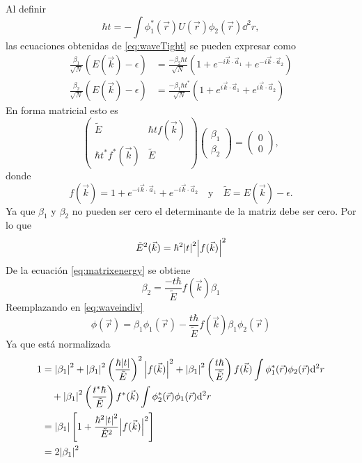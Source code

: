 Al definir 
\begin{equation}
 \hbar t = -\int \phi_1^{\ast}(\vec{r}) U(\vec{r}) \phi_2(\vec{r}) \dd^2 r,
\end{equation}
las ecuaciones obtenidas de \eqref{eq:waveTight} se pueden expresar como
\begin{align}
  \frac{\beta_1}{\sqrt{N}}(E(\vec{k})-\epsilon) & =\frac{-\beta_2 \hbar t}{\sqrt{N}}\left(1+e^{-i \vec{k}\cdot \vec{a}_1}+e^{-i \vec{k}\cdot \vec{a}_2}\right) \\
  \frac{\beta_2}{\sqrt{N}}(E(\vec{k})-\epsilon)   & =\frac{-\beta_1\hbar t^{\ast}}{\sqrt{N}}\left(1+e^{i \vec{k}\cdot \vec{a}_1}+e^{i \vec{k}\cdot \vec{a}_2}\right)
\end{align}
En forma matricial esto es
\begin{equation}
	\begin{pmatrix}
    \tilde{E}                                     & \hbar tf(\vec{k}) \\
    \hbar t^{\ast}f^{\ast}(\vec{k}) & \tilde{E}
	\end{pmatrix}\begin{pmatrix}
		\beta_1 \\\beta_2
	\end{pmatrix}= \begin{pmatrix}
		0 \\0
	\end{pmatrix},\label{eq:matrixenergy}
\end{equation}
donde
\begin{equation}
  f(\vec{k}) =1+e^{-i \vec{k}\cdot \vec{a}_1}+e^{-i \vec{k}\cdot \vec{a}_2}\quad\text{y}\quad \tilde{E} = E(\vec{k}) - \epsilon.
\end{equation}
Ya que $\beta_1$ y $\beta_2$ no pueden ser cero el determinante de la matriz debe ser cero. Por lo que
\begin{equation}
  \tilde{E}^2(\vec{k}) = \hbar^2\abs{t}^2\abs{f(\vec{k})}^2\label{eq:energysquare}
\end{equation}
De la ecuación \eqref{eq:matrixenergy} se obtiene
\begin{equation}
  \beta_2 = \frac{-t\hbar}{\tilde{E}}f(\vec{k})\beta_1
\end{equation}
Reemplazando en \eqref{eq:waveindiv}
\begin{equation}
  \phi(\vec{r}) = \beta_1 \phi_1(\vec{r}) - \frac{t\hbar}{\tilde{E}}f(\vec{k})\beta_1 \phi_2(\vec{r})
\end{equation}
Ya que está normalizada
\begin{equation}
  \begin{aligned}[b]
    1 & = \abs{\beta_1}^2 +\abs{\beta_1}^2\left(\frac{\hbar\abs{t}}{\tilde{E}}\right)^2\abs{f(\vec{k})}^2+\abs{\beta_1}^2\left(\frac{t\hbar}{\tilde{E}}\right)f(\vec{k})\int \phi_1^{\ast}(\vec{r})\phi_2(\vec{r}) \dd^2 r \\&\quad+\abs{\beta_1}^2\left(\frac{t^{\ast}\hbar}{\tilde{E}}\right)f^{\ast}(\vec{k})\int \phi_2^{\ast}(\vec{r})\phi_1(\vec{r}) \dd^2 r\\
      & = \abs{\beta_1}\left[1 + \frac{\hbar^2\abs{t}^2}{\tilde{E}^2}\abs{f(\vec{k})}^2\right]\\
	           & = 2\abs{\beta_1}^2
  \end{aligned}
\end{equation}
